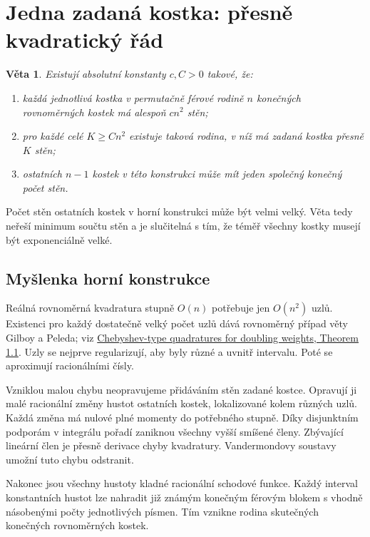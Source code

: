\documentclass[11pt]{article}
\newtheorem{veta}{Věta}
\begin{document}
\section{Jedna zadaná kostka: přesně kvadratický řád}

\begin{veta}
Existují absolutní konstanty $c,C>0$ takové, že:
\begin{enumerate}
\item každá jednotlivá kostka v permutačně férové rodině $n$ konečných
rovnoměrných kostek má alespoň $cn^2$ stěn;
\item pro každé celé $K\ge Cn^2$ existuje taková rodina, v níž má
zadaná kostka přesně $K$ stěn;
\item ostatních $n-1$ kostek v této konstrukci může mít jeden společný
konečný počet stěn.
\end{enumerate}
\end{veta}

Počet stěn ostatních kostek v horní konstrukci může být velmi velký.
Věta tedy neřeší minimum součtu stěn a je slučitelná s tím, že téměř
všechny kostky musejí být exponenciálně velké.

\subsection*{Myšlenka horní konstrukce}

Reálná rovnoměrná kvadratura stupně $O(n)$ potřebuje jen $O(n^2)$ uzlů.
Existenci pro každý dostatečně velký počet uzlů dává rovnoměrný případ
věty Gilboy a Peleda; viz
\href{https://arxiv.org/abs/1507.01505}{Chebyshev-type quadratures for doubling weights,
Theorem 1.1}. Uzly se nejprve regularizují, aby byly různé a uvnitř
intervalu. Poté se aproximují racionálními čísly.

Vzniklou malou chybu neopravujeme přidáváním stěn zadané kostce.
Opravují ji malé racionální změny hustot ostatních kostek, lokalizované
kolem různých uzlů. Každá změna má nulové plné momenty do potřebného
stupně. Díky disjunktním podporám v integrálu pořadí zaniknou všechny
vyšší smíšené členy. Zbývající lineární člen je přesně derivace chyby
kvadratury. Vandermondovy soustavy umožní tuto chybu odstranit.

Nakonec jsou všechny hustoty kladné racionální schodové funkce.
Každý interval konstantních hustot lze nahradit již známým konečným
férovým blokem s vhodně násobenými počty jednotlivých písmen.
Tím vznikne rodina skutečných konečných rovnoměrných kostek.
\end{document}
